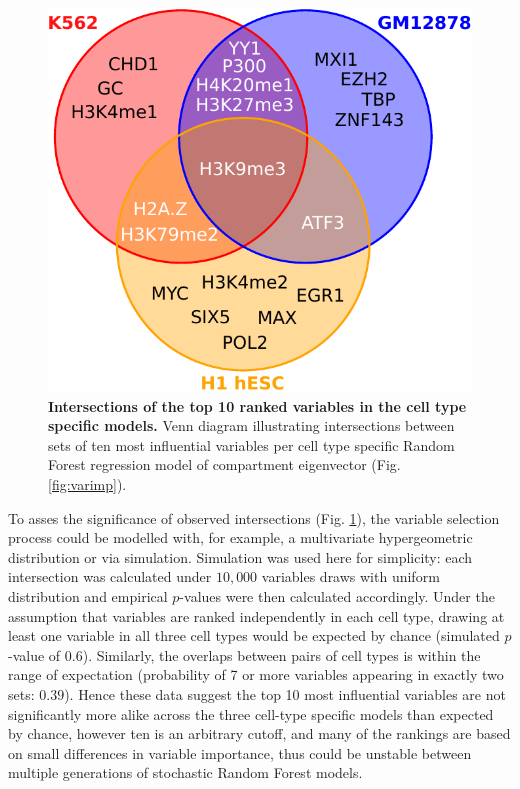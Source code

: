 \documentclass[a4paper,11pt,oneside]{book}
\begin{document}
\begin{figure}
\begin{center} 
\includegraphics[width=.5\textwidth]{figs/top10venn.pdf}
\captionsetup{width=\textwidth} 
\caption{ {\bf Intersections of the top 10 ranked variables in the cell type specific models. }
Venn diagram illustrating intersections between sets of ten most influential variables per cell type specific Random Forest regression model of compartment eigenvector (Fig. \ref{fig:varimp}).
}\label{fig:top10venn}
\end{center} 
\end{figure} 

To asses the significance of observed intersections (Fig. \ref{fig:top10venn}), the variable selection process could be modelled with, for example, a multivariate hypergeometric distribution or via simulation. Simulation was used here for simplicity: each intersection was calculated under $10,000$ variables draws with uniform distribution and empirical $p$-values were then calculated accordingly. Under the assumption that variables are ranked independently in each cell type, drawing at least one variable in all three cell types would be expected by chance (simulated $p$-value of $0.6$). Similarly, the overlaps between pairs of cell types is within the range of expectation (probability of 7 or more variables appearing in exactly two sets: $0.39$). Hence these data suggest the top 10 most influential variables are not significantly more alike across the three cell-type specific models than expected by chance, however ten is an arbitrary cutoff, and many of the rankings are based on small differences in variable importance, thus could be unstable between multiple generations of stochastic Random Forest models.
\end{document}

